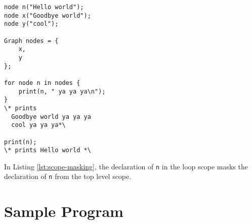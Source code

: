 \documentclass{article}
\newcommand{\code}[1]{\texttt{#1}} %
\begin{document}
\begin{lstlisting}[language=pltLang, caption=Example of masking, label=lst:scope-masking]
node n("Hello world");
node x("Goodbye world");
node y("cool");

Graph nodes = {
	x,
	y
};

for node n in nodes {
	print(n, " ya ya ya\n");
}
\* prints
  Goodbye world ya ya ya
  cool ya ya ya*\

print(n);
\* prints Hello world *\
\end{lstlisting}

In Listing \ref{lst:scope-masking}, the declaration of \code{n} in the loop scope masks the declaration of \code{n} from the top level scope.

\section{Sample Program}
\end{document}
